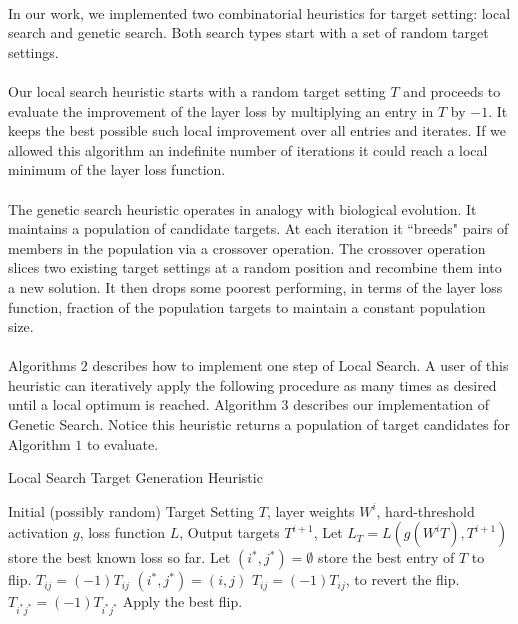 \paragraph{}
In our work, we implemented two combinatorial heuristics for target setting: local search and genetic search. Both search types start with a set of random target settings.
\paragraph{}
Our local search heuristic starts with a random target setting $T$ and proceeds to evaluate the improvement of the layer loss by multiplying an entry in $T$ by $-1$. It keeps the best possible such local improvement over all entries and iterates. If we allowed this algorithm an indefinite number of iterations it could reach a local minimum of the layer loss function.
\paragraph{}
The genetic search heuristic operates in analogy with biological evolution. It maintains a population of candidate targets. At each iteration it ``breeds" pairs of members in the population via a crossover operation. The crossover operation slices two existing target settings at a random position and recombine them into a new solution. It then drops some poorest performing, in terms of the layer loss function, fraction of the population targets to maintain a constant population size. 
\paragraph{}
Algorithms $2$ describes how to implement one step of Local Search. A user of this heuristic can iteratively apply the following procedure as many times as desired until a local optimum is reached. Algorithm $3$ describes our implementation of Genetic Search. Notice this heuristic returns a population of target candidates for Algorithm $1$ to evaluate.
\begin{algorithm}
\caption{Local Search Target Generation Heuristic}
\begin{algorithmic}
\REQUIRE Initial (possibly random) Target Setting $T$, layer weights $W^i$, hard-threshold activation $g$, loss function $L$, Output targets $T^{i+1}$, 
\STATE Let $L_T = L(g(W^iT), T^{i+1})$ store the best known loss so far.
\STATE Let $(i^*,j^*) = \emptyset$ store the best entry of $T$ to flip.
\STATE $T_{ij} = (-1)T_{ij}$
\STATE $(i^*,j^*) = (i,j)$
\ENDIF
\STATE $T_{ij} = (-1)T_{ij}$, to revert the flip.
\ENDFOR
{}
\STATE $T_{i^*j^*} = (-1)T_{i^*j^*}$ Apply the best flip.
\ENDIF
{}
\end{algorithmic}
\end{algorithm} 

